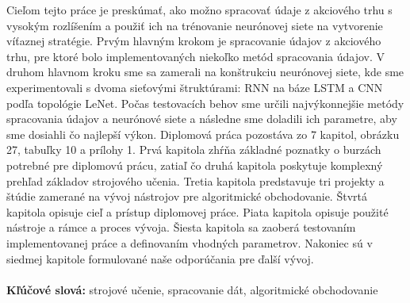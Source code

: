 \documentclass[a4paper,oneside,onecolumn,12pt]{book}
\begin{document}


\label{sec:abstrakt}
\thispagestyle{empty}
Cieľom tejto práce je preskúmať, ako možno spracovať údaje z akciového trhu s vysokým rozlíšením a použiť ich na trénovanie neurónovej siete na vytvorenie víťaznej stratégie. Prvým hlavným krokom je spracovanie údajov z akciového trhu, pre ktoré bolo implementovaných niekoľko metód spracovania údajov. V druhom hlavnom kroku sme sa zamerali na konštrukciu neurónovej siete, kde sme experimentovali s dvoma sieťovými štruktúrami: RNN na báze LSTM a CNN podľa topológie LeNet. Počas testovacích behov sme určili najvýkonnejšie metódy spracovania údajov a neurónové siete a následne sme doladili ich parametre, aby sme dosiahli čo najlepší výkon. Diplomová práca pozostáva zo 7 kapitol, obrázku 27, tabuľky 10 a prílohy 1. Prvá kapitola zhŕňa základné poznatky o burzách potrebné pre diplomovú prácu, zatiaľ čo druhá kapitola poskytuje komplexný prehľad základov strojového učenia. Tretia kapitola predstavuje tri projekty a štúdie zamerané na vývoj nástrojov pre algoritmické obchodovanie. Štvrtá kapitola opisuje cieľ a prístup diplomovej práce. Piata kapitola opisuje použité nástroje a rámce a proces vývoja. Šiesta kapitola sa zaoberá testovaním implementovanej práce a definovaním vhodných parametrov. Nakoniec sú v siedmej kapitole formulované naše odporúčania pre ďalší vývoj.
\\\\
\textbf{Kľúčové slová:} strojové učenie, spracovanie dát, algoritmické obchodovanie
\pagebreak
\end{document}

